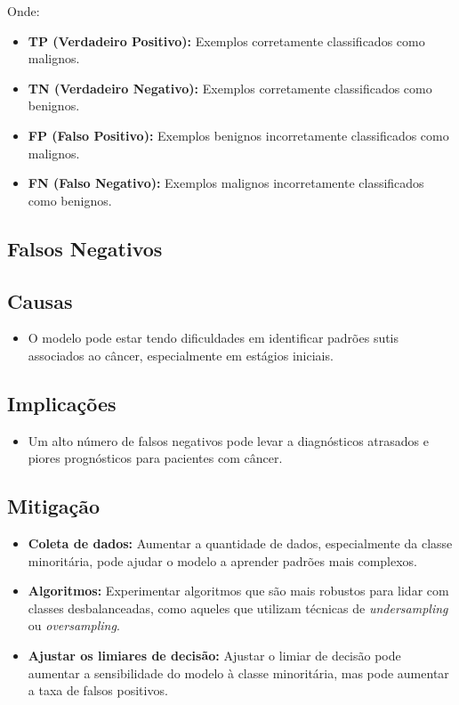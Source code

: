 \documentclass[12pt,a4paper,oneside,openany]{article}
\begin{document}
\noindent Onde:
\begin{itemize}
    \item \textbf{TP (Verdadeiro Positivo):} Exemplos corretamente classificados como malignos.
    \item \textbf{TN (Verdadeiro Negativo):} Exemplos corretamente classificados como benignos.
    \item \textbf{FP (Falso Positivo):} Exemplos benignos incorretamente classificados como malignos.
    \item \textbf{FN (Falso Negativo):} Exemplos malignos incorretamente classificados como benignos.
\end{itemize}

\subsection*{Falsos Negativos}

\subsection*{Causas}
\begin{itemize}
    \item O modelo pode estar tendo dificuldades em identificar padrões sutis associados ao câncer, especialmente em estágios iniciais.
\end{itemize}

\subsection*{Implicações}
\begin{itemize}
    \item Um alto número de falsos negativos pode levar a diagnósticos atrasados e piores prognósticos para pacientes com câncer.
\end{itemize}

\subsection*{Mitigação}
\begin{itemize}
    \item \textbf{Coleta de dados:} Aumentar a quantidade de dados, especialmente da classe minoritária, pode ajudar o modelo a aprender padrões mais complexos.
    \item \textbf{Algoritmos:} Experimentar algoritmos que são mais robustos para lidar com classes desbalanceadas, como aqueles que utilizam técnicas de \textit{undersampling} ou \textit{oversampling}.
    \item \textbf{Ajustar os limiares de decisão:} Ajustar o limiar de decisão pode aumentar a sensibilidade do modelo à classe minoritária, mas pode aumentar a taxa de falsos positivos.
\end{itemize}
\end{document}
